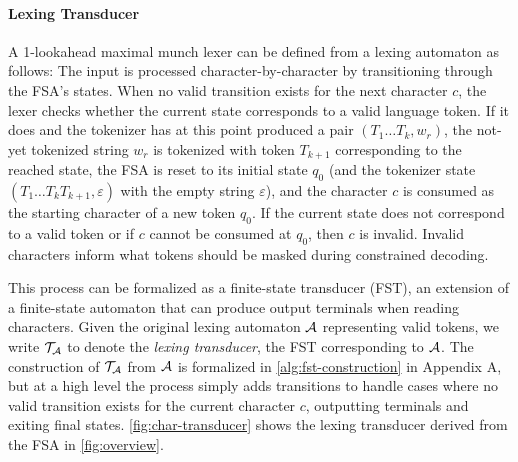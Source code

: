 
\paragraph{Lexing Transducer}


A 1-lookahead maximal munch lexer can be defined from a lexing automaton as follows:
The input is processed character-by-character by transitioning through the FSA's states.
When no valid transition exists for the next character $c$, the lexer checks whether the current state corresponds to a valid language token. 
% 
If it does and the tokenizer has at this point produced a pair $(T_1\ldots T_k, w_r)$, the not-yet tokenized string $w_r$ is tokenized with token $T_{k+1}$ corresponding to the reached state, the FSA is reset to its initial state $q_0$ (and the tokenizer state $(T_1\ldots T_k T_{k+1}, \varepsilon)$ with the empty string $\varepsilon$), and the character $c$ is consumed as the starting character of a new token $q_0$. 
If the current state does not correspond to a valid token or if $c$ cannot be consumed at $q_0$, then $c$ is invalid. 
% 
Invalid characters inform what tokens should be masked during constrained decoding.

%

This process can be formalized as a finite-state transducer (FST), an extension of a finite-state automaton that can produce output terminals when reading characters. Given the original lexing automaton $\mathcal{A}$ representing valid tokens, we write $\mathcal{T}_{\mathcal{A}}$ to denote the \emph{lexing transducer}, the FST corresponding to $\mathcal{A}$.
% 
The construction of $\mathcal{T}_{\mathcal{A}}$ from $\mathcal{A}$ is formalized in \autoref{alg:fst-construction} in Appendix A, but at a high level the process simply adds transitions to handle cases where no valid transition exists for the current character $c$, outputting terminals and exiting final states. 
\autoref{fig:char-transducer} shows the lexing transducer derived from the FSA in \autoref{fig:overview}.

